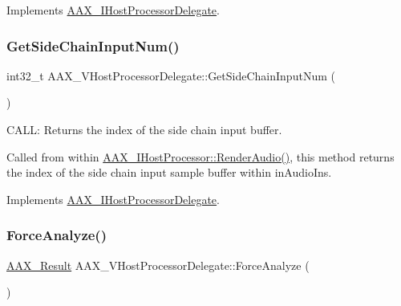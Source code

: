 Implements \mbox{\hyperlink{a01837_ae083d877253163dd367f46c7c491e9e3}{A\+A\+X\+\_\+\+I\+Host\+Processor\+Delegate}}.

\mbox{\label{a01921_a31d793b6a43eb642446f6149621bcdf9}} 
\subsubsection{\texorpdfstring{GetSideChainInputNum()}{GetSideChainInputNum()}}
{\footnotesize\ttfamily int32\+\_\+t A\+A\+X\+\_\+\+V\+Host\+Processor\+Delegate\+::\+Get\+Side\+Chain\+Input\+Num (\begin{DoxyParamCaption}{ }\end{DoxyParamCaption})\hspace{0.3cm}{\ttfamily [virtual]}}



C\+A\+LL\+: Returns the index of the side chain input buffer. 

Called from within \mbox{\hyperlink{a01693_a29f1352c77cdcce8dbac4d32f1a88887}{A\+A\+X\+\_\+\+I\+Host\+Processor\+::\+Render\+Audio()}}, this method returns the index of the side chain input sample buffer within {\ttfamily in\+Audio\+Ins}. 

Implements \mbox{\hyperlink{a01837_aaf6821f08105fd949aa9e78f3a1f7f50}{A\+A\+X\+\_\+\+I\+Host\+Processor\+Delegate}}.

\mbox{\label{a01921_aeb3eb18f1c9562a31173d600dad9b251}} 
\subsubsection{\texorpdfstring{ForceAnalyze()}{ForceAnalyze()}}
{\footnotesize\ttfamily \mbox{\hyperlink{a00392_a4d8f69a697df7f70c3a8e9b8ee130d2f}{A\+A\+X\+\_\+\+Result}} A\+A\+X\+\_\+\+V\+Host\+Processor\+Delegate\+::\+Force\+Analyze (\begin{DoxyParamCaption}{ }\end{DoxyParamCaption})\hspace{0.3cm}{\ttfamily [virtual]}}



